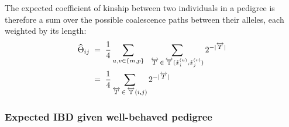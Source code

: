 \documentclass[12pt]{article}
\numberwithin{equation}{section}
\begin{document}
The expected coefficient of kinship between two individuals in a pedigree is therefore a sum over the possible coalescence paths between their alleles, each weighted by its length:
\begin{equation}\label{eq:kinship-cpaths}
\begin{aligned}
    \widehat\Theta_{ij} \;&=\; \frac14 \sum_{u,v \in \{m,p\}}\ \ \sum_{\Cpath \,\in\, \Cset(\mathring{x}_i^{(u)}, \mathring{x}_j^{(v)})} 2^{-|\Cpath|} \\
    \;&=\; \frac14 \sum_{\Cpath \,\in\, \Cset(i,j)} 2^{-|\Cpath|}
\end{aligned}
\end{equation}

\subsubsection{Expected IBD given well-behaved pedigree}\label{sec:ibd-well-behaved}
\end{document}
